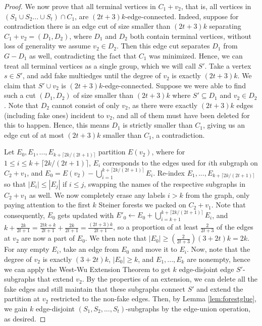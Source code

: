 \documentclass{article}
\begin{document}
\begin{proof}
    We now prove that all terminal vertices in $C_1+v_2$, that is, all vertices in $(S_1 \cup S_2... \cup S_t) \cap C_1$, are $(2t+3)k$-edge-connected. Indeed, suppose for contradiction there is an edge cut of size smaller than $(2t+3)k$ separating $C_1+v_2=(D_1,D_2)$, where $D_1$ and $D_2$ both contain terminal vertices, without loss of generality we assume $v_2 \in D_2$. Then this edge cut separates $D_1$ from $G-D_1$ as well, contradicting the fact that $C_1$ was minimized. Hence, we can treat all terminal vertices as a single group, which we will call $S'$. Take a vertex $s \in S'$, and add fake multiedges until the degree of $v_2$ is exactly $(2t+3)k$. We claim that $S' \cup v_2$ is $(2t+3)k$-edge-connected. 
    Suppose we were able to find such a cut $(D_1,D_2)$ of size smaller than $(2t+3)k$ where $S' \subseteq D_1$ and $v_2 \in D_2$. Note that $D_2$ cannot consist of only $v_2$, as there were exactly $(2t+3)k$ edges (including fake ones) incident to $v_2$, and all of them must have been deleted for this to happen. Hence, this means $D_1$ is strictly smaller than $C_1$, giving us an edge cut of at most $(2t+3)k$ smaller than $C_1$, a contradiction. 
    
    Let $E_0,E_1,...,E_{k+\lceil 2k/(2t+1) \rceil}$ partition $E(v_2)$, where for $1 \leq i \leq k+\lceil 2k/(2t+1) \rceil$, $E_i$ corresponds to the edges used for $i$th subgraph on $C_2+v_1$, and $E_0 = E(v_2) - \bigcup_{i=1}^{k+\lceil 2k/(2t+1) \rceil} E_i$. Re-index $E_1,...,E_{k+\lceil 2k/(2t+1) \rceil}$ so that $|E_i| \leq |E_j|$ if $i \leq j$, swapping the names of the respective subgraphs in $C_2+v_1$ as well. We now completely erase any labels $i > k$ from the graph, only paying attention to the first $k$ Steiner forests we packed on $C_2+v_1$. Note that consequently, $E_0$ gets updated with $E'_0 \leftarrow E_0 + \bigcup_{i=k+1}^{k+\lceil 2k/(2t+1) \rceil} E_i$, and $k+\frac{2k}{2t+1} = \frac{2tk+k}{2t+1}+\frac{2k}{2t+1} = \frac{(2t+3)k}{2t+1}$, so a proportion of at least $\frac{2}{2t+3}$ of the edges at $v_2$ are now a part of $E_0$. We then note that $|E_0| \geq (\frac{2}{2t+3})(3+2t)k = 2k$. For any empty $E_i$, take an edge from $E_0$ and move it to $E_i$. Now, note that the degree of $v_2$ is exactly $(3+2t)k$, $|E_0| \geq k$, and $E_1,...,E_k$ are nonempty, hence we can apply the West-Wu Extension Theorem to get $k$ edge-disjoint edge $S'$-subgraphs that extend $v_2$. By the properties of an extension, we can delete all the fake edges and still maintain that these subgraphs connect $S'$ and extend the partition at $v_2$ restricted to the non-fake edges. Then, by Lemma \ref{lem:forestglue}, we gain $k$ edge-disjoint $(S_1,S_2,...,S_t)$-subgraphs by the edge-union operation, as desired. 
\end{proof}
\end{document}
